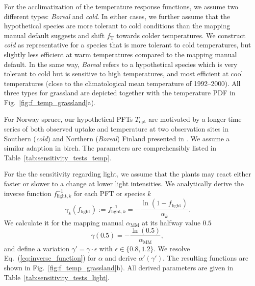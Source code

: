 \documentclass[bg, manuscript]{copernicus}
\begin{document}
For the acclimatization of the temperature response functions, we assume two different types: \emph{Boreal} and \emph{cold}. In either cases, we further assume that the hypothetical species are more tolerant to cold conditions than the mapping manual default suggests and shift $f_\mathrm{T}$ towards colder temperatures. We construct \emph{cold} as representative for a species that is more tolerant to cold temperatures, but slightly less efficient at warm temperatures compared to the mapping manual default. In the same way, \emph{Boreal} refers to a hypothetical species which is very tolerant to cold but is sensitive to high temperatures, and most efficient at cool temperatures (close to the climatological mean temperature of 1992--2000). All three types for grassland are depicted together with the temperature PDF in Fig.~\ref{fig:f_temp_grassland}a).

For Norway spruce, our hypothetical PFTs $T_\mathrm{opt}$ are motivated by a longer time series of both observed  uptake and temperature at two observation sites in Southern (\emph{cold}) and Northern (\emph{Boreal}) Finland presented in \citet{TB:Kolari2007}. We assume a similar adaption in birch. The parameters are comprehensibly listed in Table~\ref{tab:sensitivity_tests_temp}.

For the the sensitivity regarding light, we assume that the plants may react either faster or slower to a change at lower light intensities. We analytically derive the inverse function $f_{\mathrm{light},k}^{-1}$ for each PFT or species $k$
\begin{equation}
  \gamma_k(f_\mathrm{light}) := f_{\mathrm{light}, k}^{-1} = -\frac{\ln(1-f_\mathrm{light})}{\alpha_k}.
  \label{eq:inverse_function}
\end{equation}
We calculate it for the mapping manual $\alpha_\mathrm{MM}$ at its halfway value $0.5$ 
\begin{equation}
  \gamma(0.5) = -\frac{\ln(0.5)}{\alpha_\mathrm{MM}},
  \label{eq:inverse_function_halfway}
\end{equation}
and define a variation $\gamma' = \gamma \cdot \epsilon$ with $\epsilon \in \{0.8, 1.2\}$. We resolve Eq.~(\ref{eq:inverse_function}) for $\alpha$ and derive $\alpha'(\gamma')$. The resulting functions are shown in Fig.~\ref{fig:f_temp_grassland}b). All derived parameters are given in Table~\ref{tab:sensitivity_tests_light}.
\end{document}
